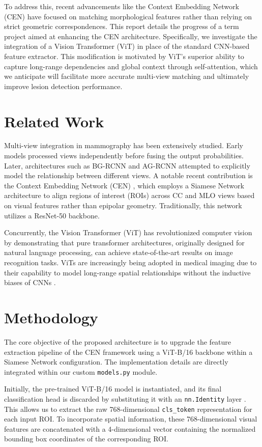 \documentclass[conference]{IEEEtran}
\begin{document}
To address this, recent advancements like the Context Embedding Network (CEN) have focused on matching morphological features rather than relying on strict geometric correspondences. This report details the progress of a term project aimed at enhancing the CEN architecture. Specifically, we investigate the integration of a Vision Transformer (ViT) in place of the standard CNN-based feature extractor. This modification is motivated by ViT's superior ability to capture long-range dependencies and global context through self-attention, which we anticipate will facilitate more accurate multi-view matching and ultimately improve lesion detection performance.

\section{Related Work}
Multi-view integration in mammography has been extensively studied. Early models processed views independently before fusing the output probabilities. Later, architectures such as BG-RCNN and AG-RCNN attempted to explicitly model the relationship between different views. A notable recent contribution is the Context Embedding Network (CEN) \cite{b1}, which employs a Siamese Network architecture to align regions of interest (ROIs) across CC and MLO views based on visual features rather than epipolar geometry. Traditionally, this network utilizes a ResNet-50 \cite{b6} backbone.

Concurrently, the Vision Transformer (ViT) \cite{b2} has revolutionized computer vision by demonstrating that pure transformer architectures, originally designed for natural language processing, can achieve state-of-the-art results on image recognition tasks. ViTs are increasingly being adopted in medical imaging due to their capability to model long-range spatial relationships without the inductive biases of CNNs \cite{b4}.

\section{Methodology}
The core objective of the proposed architecture is to upgrade the feature extraction pipeline of the CEN framework using a ViT-B/16 backbone within a Siamese Network configuration. The implementation details are directly integrated within our custom \texttt{models.py} module.

Initially, the pre-trained ViT-B/16 model is instantiated, and its final classification head is discarded by substituting it with an \texttt{nn.Identity} layer \cite{b5}. This allows us to extract the raw 768-dimensional \texttt{cls\_token} representation for each input ROI. To incorporate spatial information, these 768-dimensional visual features are concatenated with a 4-dimensional vector containing the normalized bounding box coordinates of the corresponding ROI.
\end{document}

